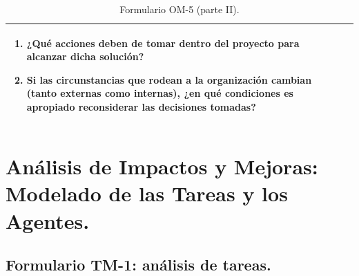 \documentclass[12pt,a4paper,twoside,spanish]{article}      %
\begin{document}
\begin{table}[H]
\begin{tabularx}{\textwidth}{|l|X|}
\begin{enumerate}
                    \item ¿Qué acciones deben de tomar dentro del proyecto para alcanzar dicha solución?
                    
                    \item Si las circunstancias que rodean a la organización cambian (tanto externas como internas), ¿en qué condiciones es apropiado reconsiderar las decisiones tomadas?
                \end{enumerate}
                \\ \hline
            \end{tabularx}
            \caption{Formulario OM-5 (parte II).}
              \label{tab.OM5_2}
        \end{table}
        
        
        \pagebreak
        
    \section{Análisis de Impactos y Mejoras: Modelado de las Tareas y los Agentes.}
    
        \subsection{Formulario TM-1: análisis de tareas.}
        
\end{document}
